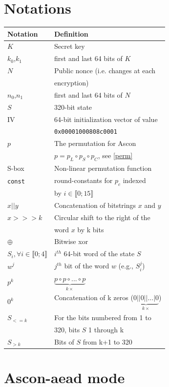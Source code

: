 \documentclass[11pt,technote]{IEEEtran}
\begin{document}
		
		\section{Notations} \label{notations}
		\begin{tabular}{ll}
				\hline
				\textbf{Notation}&\textbf{Definition}\\
				\hline
				$K$&Secret key\\
				$k_0$,$k_1$&first and last 64 bits of $K$\\
				$N$&Public nonce (i.e. changes at each\\
				&encryption)\\
				$n_0$,$n_1$&first and last 64 bits of $N$\\
				$S$&320-bit state\\
				IV&64-bit initialization vector of value\\
				&\verb|0x00001000808c0001|\\
				$p$&The permutation for Ascon \\
				&$p=p_L \circ p_S \circ p_C$, see \ref{perm}\\
				S-box&Non-linear permutation function\\
				\verb|const|&round-constants for $p_c$ indexed \\
				&by $i \in \llbracket 0;15 \rrbracket$ \\
				\hline
				$x||y$&Concatenation of bitstrings $x$ and $y$\\
				$x>>>k$&Circular shift to the right of the\\
				&word $x$ by k bits\\
				$\oplus$&Bitwise xor\\
				\hline
				$S_i, \forall i \in \llbracket 0;4 \rrbracket$&$i^{th}$ 64-bit word of the state $S$\\
				$w^j$&$j^{th}$ bit of the word $w$ (e.g., $S_i^j$) \\
				$p^k$&$\underbrace{p \circ p \circ ... \circ p}_{k \times}$\\
				$0^k$&Concatenation of k zeros ($\underbrace{0||0|| ... |0}_{k \times}$)\\
				$S_{<=k}$&For the bits numbered from 1 to\\
				&320, bits $S$ 1 through k\\
				$S_{>k}$&Bits of $S$ from k+1 to 320\\
				\hline
			\end{tabular}
			
		
		\section{Ascon-\ac{aead} mode}
		
\end{document}
